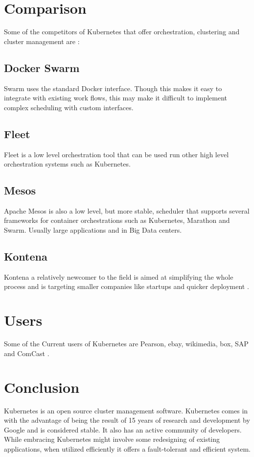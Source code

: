 \documentclass[9pt,twocolumn,twoside]{../../styles/osajnl}
\begin{document}
\section{Comparison}
Some of the competitors of Kubernetes that offer orchestration, clustering and cluster management are \cite{www-kubernetesarticle}:
\subsection{Docker Swarm}
 Swarm uses the standard  Docker interface. Though this makes it easy to integrate with existing work flows, this may make it difficult to implement complex scheduling with custom interfaces.
\subsection{Fleet}
Fleet is a low level orchestration tool that can be used run other high level orchestration systems such as Kubernetes.
\subsection{Mesos}
Apache Mesos is also a low level, but more stable, scheduler that supports several frameworks for container orchestrations such as Kubernetes, Marathon and Swarm. Usually large applications and in Big Data centers.
\subsection{Kontena}
Kontena a relatively newcomer to the field is aimed at simplifying the whole process and is targeting smaller companies like startups and quicker deployment \cite{www-kontenasite}.
\section{Users}
Some of the Current users of Kubernetes are Pearson, ebay, wikimedia, box, SAP and ComCast \cite{www-kubernetesusers}.
\section{Conclusion}
Kubernetes is an open source cluster management software. Kubernetes comes in with the advantage of being the result of 15 years of research and development by Google and is considered stable. It also has an active community of developers. While embracing Kubernetes might involve some redesigning of existing applications, when utilized efficiently it offers a fault-tolerant and efficient system.
\end{document}
